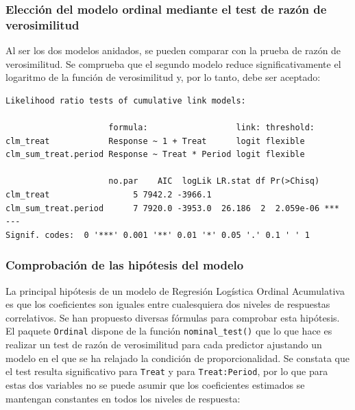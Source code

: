 \documentclass[
  12pt,
  a4paper,
  extrafontsizes,
  onecolumn,
  openright,
  table]{memoir}
\begin{document}
\hypertarget{sec-mejor-modelo-efectos-fijos}{%
\subsubsection{Elección del modelo ordinal mediante el test de razón de
verosimilitud}\label{sec-mejor-modelo-efectos-fijos}}

Al ser los dos modelos anidados, se pueden comparar con la prueba de
razón de verosimilitud. Se comprueba que el segundo modelo reduce
significativamente el logaritmo de la función de verosimilitud y, por lo
tanto, debe ser aceptado:

\scriptsize

\begin{verbatim}
Likelihood ratio tests of cumulative link models:
 
                     formula:                  link: threshold:
clm_treat            Response ~ 1 + Treat      logit flexible  
clm_sum_treat.period Response ~ Treat * Period logit flexible  

                     no.par    AIC  logLik LR.stat df Pr(>Chisq)    
clm_treat                 5 7942.2 -3966.1                          
clm_sum_treat.period      7 7920.0 -3953.0  26.186  2  2.059e-06 ***
---
Signif. codes:  0 '***' 0.001 '**' 0.01 '*' 0.05 '.' 0.1 ' ' 1
\end{verbatim}

\normalsize

\hypertarget{comprobaciuxf3n-de-las-hipuxf3tesis-del-modelo}{%
\subsubsection{Comprobación de las hipótesis del
modelo}\label{comprobaciuxf3n-de-las-hipuxf3tesis-del-modelo}}

La principal hipótesis de un modelo de Regresión Logística Ordinal
Acumulativa es que los coeficientes son iguales entre cualesquiera dos
niveles de respuestas correlativos. Se han propuesto diversas fórmulas
para comprobar esta hipótesis. El paquete \texttt{Ordinal} dispone de la
función \texttt{nominal\_test()} que lo que hace es realizar un test de
razón de verosimilitud para cada predictor ajustando un modelo en el que
se ha relajado la condición de proporcionalidad. Se constata que el test
resulta significativo para \texttt{Treat} y para \texttt{Treat:Period},
por lo que para estas dos variables no se puede asumir que los
coeficientes estimados se mantengan constantes en todos los niveles de
respuesta:
\end{document}
